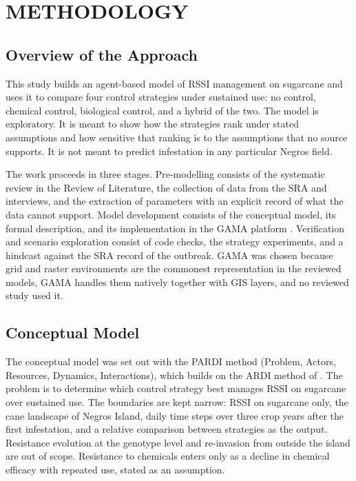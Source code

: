 \section{METHODOLOGY}

\subsection{Overview of the Approach}

This study builds an agent-based model of RSSI management on sugarcane and uses it to compare four control strategies under sustained use: no control, chemical control, biological control, and a hybrid of the two. The model is exploratory. It is meant to show how the strategies rank under stated assumptions and how sensitive that ranking is to the assumptions that no source supports. It is not meant to predict infestation in any particular Negros field.

The work proceeds in three stages. Pre-modelling consists of the systematic review in the Review of Literature, the collection of data from the SRA and interviews, and the extraction of parameters with an explicit record of what the data cannot support. Model development consists of the conceptual model, its formal description, and its implementation in the GAMA platform \citep{Taillandier2019}. Verification and scenario exploration consist of code checks, the strategy experiments, and a hindcast against the SRA record of the outbreak. GAMA was chosen because grid and raster environments are the commonest representation in the reviewed models, GAMA handles them natively together with GIS layers, and no reviewed study used it.

\subsection{Conceptual Model}

The conceptual model was set out with the PARDI method (Problem, Actors, Resources, Dynamics, Interactions), which builds on the ARDI method of \citet{Etienne2011}. The problem is to determine which control strategy best manages RSSI on sugarcane over sustained use. The boundaries are kept narrow: RSSI on sugarcane only, the cane landscape of Negros Island, daily time steps over three crop years after the first infestation, and a relative comparison between strategies as the output. Resistance evolution at the genotype level and re-invasion from outside the island are out of scope. Resistance to chemicals enters only as a decline in chemical efficacy with repeated use, stated as an assumption.

